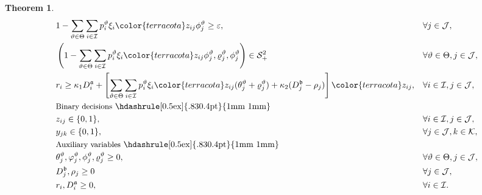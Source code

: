 \documentclass[a4paper,11pt,reqno]{amsart}
\newtheorem{theorem}{Theorem}
\renewcommand{\SS}{\mathcal{S}}
\newcommand{\K}{\mathcal{K}}
\newcommand{\I}{\mathcal{I}}
\newcommand{\J}{\mathcal{J}}
\newcommand{\highlight}[1]{{\color{terracota} #1}}
\begin{document}
\begin{theorem}
\begin{align*}
    & 1-\sum_{\vartheta\in\Theta} \sum_{i\in\I}p_i^\vartheta\xi_i\highlight{z_{ij}\phi_j^\vartheta} \geq \varepsilon, && \forall j\in\J,\\
    & \left(1-\sum_{\vartheta\in\Theta}\sum_{i\in\I}p_i^\vartheta\xi_i\highlight{z_{ij}\phi_j^\vartheta}, \varrho_j^\vartheta, \phi_j^\vartheta\right)\in \SS^2_+&& \forall \vartheta\in\Theta,j\in \J,\\
   & r_i\geq \kappa_1 D^{\frak a}_i+ \left[\sum_{\vartheta\in\Theta} \sum_{i\in\I}p_i^\vartheta\xi_i\highlight{z_{ij}(\theta_j^\vartheta+\varrho_j^\vartheta)} + \kappa_2(D^{\frak b}_j-\rho_j)\right]\highlight{z_{ij}}, &&  \forall i\in\I,j\in \J,\\
   \noalign{
    \noindent {\small Binary decisions} \hdashrule[0.5ex]{.83\linewidth}{0.4pt}{1mm 1mm}
    }
    & z_{ij} \in \{0,1\}, && \forall i \in \I, j \in \J,\\
   & y_{jk} \in \{0,1\}, && \forall j \in \J, k \in \K,\\
   \noalign{
    \noindent {\small Auxiliary variables} \hdashrule[0.5ex]{.83\linewidth}{0.4pt}{1mm 1mm}
    }
   & \theta_j^\vartheta, \varphi_j^\vartheta,\phi_j^\vartheta, \varrho_j^\vartheta\geq 0, && \forall \vartheta\in\Theta,j\in \J,\\
   & D_j^\frak{b},\rho_j \geq 0 && \forall j\in\J, \\
   & r_i, D_{i}^\frak{a}\geq 0, && \forall i\in\I.
\end{align*}
\end{theorem}
\end{document}
